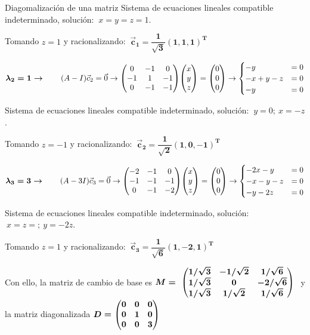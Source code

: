 \begin{myexampleblock}{Diagomalización de una matriz}
\vspace{2mm}Sistema de ecuaciones lineales compatible indeterminado, solución: $\ x=y=z=1$. 
 
\vspace{2mm}Tomando $z=1$ y racionalizando:  $\ \boldsymbol {\vec c_1=\dfrac 1 {\sqrt{3}} (1,1,1)^T}$

\vspace{2mm} $\boldsymbol{\lambda_2=1 \to } \quad \quad (A-I)\vec c_2=\vec 0 \to \mqty(0&-1&0\\-1&1&-1\\0&-1&-1)\mqty(x\\y\\z)=\mqty(0\\0\\0) \to \begin{cases}
 	-y&=0\\-x+y-z&=0\\-y&=0
 \end{cases}$
 
\vspace{2mm}Sistema de ecuaciones lineales compatible indeterminado, solución: $\ y=0;\ x=-z$. 
 
\vspace{2mm}Tomando $z=-1$ y racionalizando:  $\ \boldsymbol {\vec c_2=\dfrac 1 {\sqrt{2}} (1,0,-1)^T}$

\vspace{2mm} $\boldsymbol{\lambda_3=3 \to } \quad \quad (A-3I)\vec c_3=\vec 0 \to \mqty(-2&-1&0\\-1&-1&-1\\0&-1&-2)\mqty(x\\y\\z)=\mqty(0\\0\\0) \to \begin{cases}
 	-2x-y&=0\\-x-y-z&=0\\-y-2z&=0
 \end{cases}$
 
\vspace{2mm}Sistema de ecuaciones lineales compatible indeterminado, solución: $\ x=z=; \ y=-2z$. 
 
\vspace{2mm}Tomando $z=1$ y racionalizando:  $\ \boldsymbol {\vec c_3=\dfrac 1 {\sqrt{6}} (1,-2,1)^T}$

\vspace{2mm}Con ello, la matriz de cambio de base es $\boldsymbol{ M=\ \mqty(1/\sqrt{3} & -1/\sqrt{2} & 1/\sqrt{6} \\ 1/\sqrt{3} & 0 & -2/\sqrt{6} \\ 1/\sqrt{3} & 1/\sqrt{2} & 1/\sqrt{6})\ }$ y la matriz diagonalizada $\boldsymbol{ D=\mqty(0&0&0\\0&1&0\\0&0&3) }$



\end{myexampleblock}
